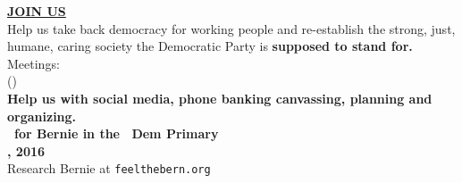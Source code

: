 \newcommand{\checkbox}{\makebox[0pt][l]{$\square$}\raisebox{.15ex}{\hspace{0.1em}$\checkmark$}}

\vspace{-10pt}

\begin{center}
  {\Huge\bf\underline{JOIN US}}\\[10pt]

  Help us take back democracy for working people and re-establish the
  strong, just, humane, caring society the Democratic Party is {\bf
    supposed to stand for.}\\[10pt]

Meetings: \MeetingTime\ \MeetingAddress\\
(\MeetingPlacename)\\[10pt]

{\bf
Help us with social media, phone banking
canvassing, planning and organizing.\\[10pt]

\Vote\ for Bernie in the \State\ Dem Primary\\
\PDate, 2016
}\\[10pt]

Research Bernie at {\tt feelthebern.org}\\[10pt]

\ContactInfo
\vspace{-35pt}
\end{center}	
